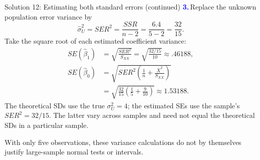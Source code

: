 \documentclass[notes,10pt, aspectratio=169]{beamer}
\newcommand{\answerpart}[1]{\textcolor{blue}{\textbf{#1.}}\,}
\begin{document}
\begin{frame}{Solution 12: Estimating both standard errors (continued)}
\small
\answerpart{3}Replace the unknown population error variance by
\[
\widehat\sigma_U^2=SER^2=\frac{SSR}{n-2}
=\frac{6.4}{5-2}=\frac{32}{15}.
\]
Take the square root of each estimated coefficient variance:
\begin{align*}
SE(\widehat\beta_1)
&=\sqrt{\frac{SER^2}{S_{XX}}}
=\sqrt{\frac{32/15}{10}}
\approx\boxed{.46188},\\[5pt]
SE(\widehat\beta_0)
&=\sqrt{SER^2\left(\frac1n+\frac{\overline X^2}{S_{XX}}\right)}\\
&=\sqrt{\frac{32}{15}\left(\frac15+\frac9{10}\right)}
\approx\boxed{1.53188}.
\end{align*}
The theoretical SDs use the true $\sigma_U^2=4$; the estimated SEs use the sample's $SER^2=32/15$. The latter vary across samples and need not equal the theoretical SDs in a particular sample.
\par\vspace{7pt}
With only five observations, these variance calculations do not by themselves justify large-sample normal tests or intervals.
\end{frame}
\fi
\end{document}
